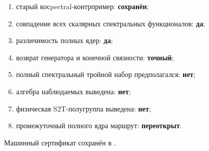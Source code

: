 \begin{protocol}
\begin{enumerate}
 \item старый косpectral-контрпример: \textbf{сохранён};
 \item совпадение всех скалярных спектральных функционалов: \textbf{да};
 \item различимость полных ядер: \textbf{да};
 \item возврат генератора и конечной связности: \textbf{точный};
 \item полный спектральный тройной набор предполагался: \textbf{нет};
 \item алгебра наблюдаемых выведена: \textbf{нет};
 \item физическая S2T-полугруппа выведена: \textbf{нет};
 \item промежуточный полного ядра маршрут: \textbf{переоткрыт}.
\end{enumerate}
\end{protocol}

Машинный сертификат сохранён в
.